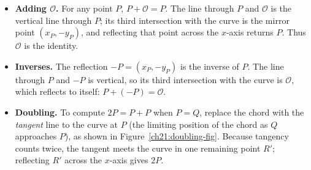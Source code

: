 \begin{itemize}
  \item \textbf{Adding $\mathcal{O}$.} For any point $P$, $P + \mathcal{O} = P$. The
        line through $P$ and $\mathcal{O}$ is the vertical line through $P$; its third
        intersection with the curve is the mirror point $(x_P,-y_P)$, and reflecting that
        point across the $x$-axis returns $P$. Thus $\mathcal{O}$ is the identity.
  \item \textbf{Inverses.} The reflection $-P = (x_P, -y_P)$ is the inverse of $P$. The
        line through $P$ and $-P$ is vertical, so its third intersection with the curve is
        $\mathcal{O}$, which reflects to itself: $P + (-P) = \mathcal{O}$.
  \item \textbf{Doubling.} To compute $2P = P + P$ when $P=Q$, replace the chord with the
        \emph{tangent} line to the curve at $P$ (the limiting position of the chord as
        $Q$ approaches $P$), as shown in Figure~\ref{ch21:doubling-fig}. Because tangency
        counts twice, the tangent meets the curve in one remaining point $R'$; reflecting
        $R'$ across the $x$-axis gives $2P$.
\end{itemize}


